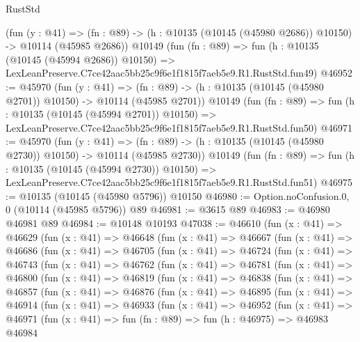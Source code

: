 \begin{lexlean}{RustStd}
\begin{coremodule}
    (fun (y : @41) =>
    (fn : @89) -> (h : @10135 (@10145 (@45980 @2686)) @10150) -> @10114 (@45985 @2686))
    @10149
    (fun (fn : @89) =>
    fun (h : @10135 (@10145 (@45994 @2686)) @10150) =>
    LexLeanPreserve.C7ce42aac5bb25c9f6e1f1815f7aeb5e9.R1.RustStd.fun49)
@46952 := @45970
    (fun (y : @41) =>
    (fn : @89) -> (h : @10135 (@10145 (@45980 @2701)) @10150) -> @10114 (@45985 @2701))
    @10149
    (fun (fn : @89) =>
    fun (h : @10135 (@10145 (@45994 @2701)) @10150) =>
    LexLeanPreserve.C7ce42aac5bb25c9f6e1f1815f7aeb5e9.R1.RustStd.fun50)
@46971 := @45970
    (fun (y : @41) =>
    (fn : @89) -> (h : @10135 (@10145 (@45980 @2730)) @10150) -> @10114 (@45985 @2730))
    @10149
    (fun (fn : @89) =>
    fun (h : @10135 (@10145 (@45994 @2730)) @10150) =>
    LexLeanPreserve.C7ce42aac5bb25c9f6e1f1815f7aeb5e9.R1.RustStd.fun51)
@46975 := @10135 (@10145 (@45980 @5796)) @10150
@46980 := Option.noConfusion.{0, 0} (@10114 (@45985 @5796)) @89
@46981 := @3615 @89
@46983 := @46980 @46981 @89
@46984 := @10148 @10193
@47038 := @46610
    (fun (x : @41) =>
    @46629
      (fun (x : @41) =>
      @46648
        (fun (x : @41) =>
        @46667
          (fun (x : @41) =>
          @46686
            (fun (x : @41) =>
            @46705
              (fun (x : @41) =>
              @46724
                (fun (x : @41) =>
                @46743
                  (fun (x : @41) =>
                  @46762
                    (fun (x : @41) =>
                    @46781
                      (fun (x : @41) =>
                      @46800
                        (fun (x : @41) =>
                        @46819
                          (fun (x : @41) =>
                          @46838
                            (fun (x : @41) =>
                            @46857
                              (fun (x : @41) =>
                              @46876
                                (fun (x : @41) =>
                                @46895
                                  (fun (x : @41) =>
                                  @46914
                                    (fun (x : @41) =>
                                    @46933
                                      (fun (x : @41) =>
                                      @46952
                                        (fun (x : @41) =>
                                        @46971
                                          (fun (x : @41) =>
                                          fun (fn : @89) =>
                                          fun (h : @46975) =>
                                          @46983
                                            @46984

\end{coremodule}
\end{lexlean}
